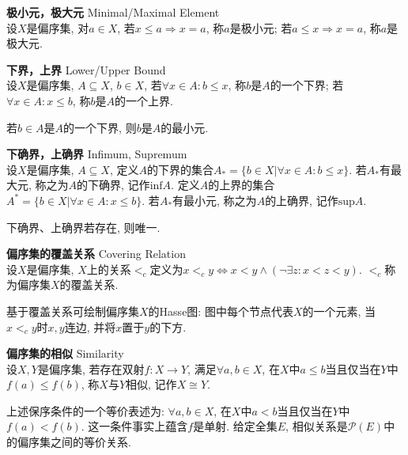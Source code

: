 \begin{dfn} \textbf{极小元，极大元} Minimal/Maximal Element\\
设$X$是偏序集, 对$a\in X$, 若$x\le a\Rightarrow x=a$, 称$a$是极小元; 若$a\le x\Rightarrow x=a$, 称$a$是极大元. 
\end{dfn}

\begin{dfn} \textbf{下界，上界} Lower/Upper Bound\\
设$X$是偏序集, $A\subseteq X$, $b\in X$, 若$\forall x\in A: b\le x$, 称$b$是$A$的一个下界; 若$\forall x\in A: x\le b$, 称$b$是$A$的一个上界. 
\end{dfn}
若$b\in A$是$A$的一个下界, 则$b$是$A$的最小元.

\begin{dfn} \textbf{下确界，上确界} Infimum, Supremum\\
设$X$是偏序集, $A\subseteq X$, 定义$A$的下界的集合$A_*=\{b\in X\vert \forall x\in A: b\le x\}$. 若$A_*$有最大元, 称之为$A$的下确界, 记作$\text{inf} A$. 定义$A$的上界的集合$A^*=\{b\in X\vert \forall x\in A: x\le b\}$. 若$A_*$有最小元, 称之为$A$的上确界, 记作$\text{sup} A$. 
\end{dfn}
\par 下确界、上确界若存在, 则唯一. 

\begin{dfn} \textbf{偏序集的覆盖关系} Covering Relation\\
设$X$是偏序集, $X$上的关系$<_c$定义为$x<_c y \iff x<y \land (\lnot \exists z: x<z<y)$. $<_c$称为偏序集$X$的覆盖关系. 
\end{dfn}

\par 基于覆盖关系可绘制偏序集$X$的Hasse图: 图中每个节点代表$X$的一个元素, 当$x<_c y$时$x,y$连边, 并将$x$置于$y$的下方. 

\begin{dfn} \textbf{偏序集的相似} Similarity\\
设$X,Y$是偏序集, 若存在双射$f:X\to Y$, 满足$\forall a,b\in X$, 在$X$中$a\le b$当且仅当在$Y$中$f(a)\le f(b)$, 称$X$与$Y$相似, 记作$X\cong Y$. 
\end{dfn}
上述保序条件的一个等价表述为: $\forall a,b\in X$, 在$X$中$a<b$当且仅当在$Y$中$f(a)<f(b)$. 这一条件事实上蕴含$f$是单射. 给定全集$E$, 相似关系是$\mathcal{P}(E)$中的偏序集之间的等价关系. 


